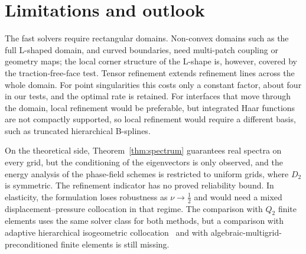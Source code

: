 \documentclass[preprint,12pt]{elsarticle}
\theoremstyle{remark}
\begin{document}
\section{Limitations and outlook}\label{sec:limits}
The fast solvers require rectangular domains. Non-convex domains such as the full L-shaped domain, and
curved boundaries, need multi-patch coupling or geometry maps; the local corner structure of the L-shape
is, however, covered by the traction-free-face test. Tensor refinement extends refinement lines across the
whole domain. For point singularities this costs only a constant factor, about four in our tests, and the optimal
rate is retained.
For interfaces that move through the domain, local refinement would be preferable, but integrated Haar
functions are not compactly supported, so local refinement would require a different basis, such as
truncated hierarchical B-splines.

On the theoretical side, Theorem~\ref{thm:spectrum} guarantees real spectra on every grid, but the
conditioning of the eigenvectors is only observed, and the energy analysis of the phase-field schemes is
restricted to uniform grids, where $D_2$ is symmetric. The refinement indicator has no proved
reliability bound. In elasticity, the formulation loses robustness as $\nu\to\frac12$ and would need a
mixed displacement--pressure collocation in that regime. The comparison with $Q_2$ finite elements uses
the same solver class for both methods, but a comparison with adaptive hierarchical isogeometric
collocation~\cite{schillinger2013isogeometric} and with algebraic-multigrid-preconditioned finite elements
is still missing.

\end{document}
